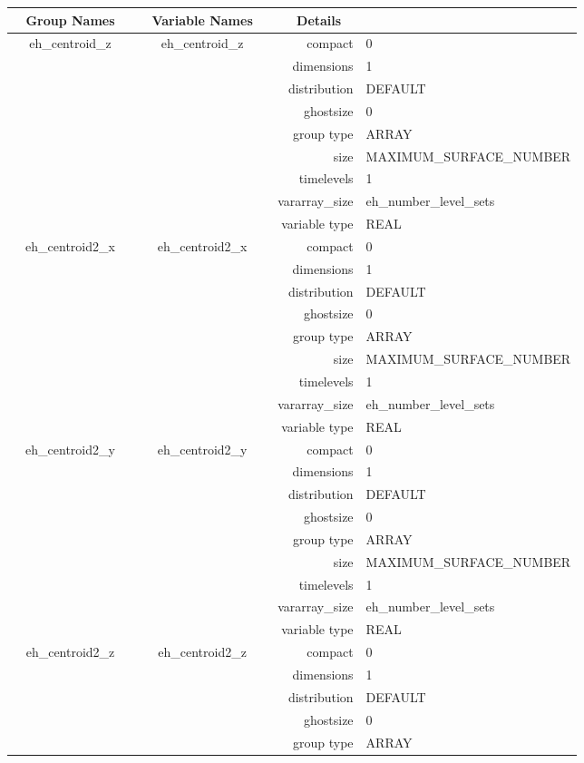 \begin{tabular*}{150mm}{|c|c@{\extracolsep{\fill}}|rl|} \hline 
~ {\bf Group Names} ~ & ~ {\bf Variable Names} ~  &{\bf Details} ~ & ~ \\ 
\hline 
eh\_centroid\_z & eh\_centroid\_z & compact & 0 \\ 
 &  & dimensions & 1 \\ 
 &  & distribution & DEFAULT \\ 
 &  & ghostsize & 0 \\ 
 &  & group type & ARRAY \\ 
 &  & size & MAXIMUM\_SURFACE\_NUMBER \\ 
 &  & timelevels & 1 \\ 
 &  & vararray\_size & eh\_number\_level\_sets \\ 
 &  & variable type & REAL \\ 
\hline 
eh\_centroid2\_x & eh\_centroid2\_x & compact & 0 \\ 
 &  & dimensions & 1 \\ 
 &  & distribution & DEFAULT \\ 
 &  & ghostsize & 0 \\ 
 &  & group type & ARRAY \\ 
 &  & size & MAXIMUM\_SURFACE\_NUMBER \\ 
 &  & timelevels & 1 \\ 
 &  & vararray\_size & eh\_number\_level\_sets \\ 
 &  & variable type & REAL \\ 
\hline 
eh\_centroid2\_y & eh\_centroid2\_y & compact & 0 \\ 
 &  & dimensions & 1 \\ 
 &  & distribution & DEFAULT \\ 
 &  & ghostsize & 0 \\ 
 &  & group type & ARRAY \\ 
 &  & size & MAXIMUM\_SURFACE\_NUMBER \\ 
 &  & timelevels & 1 \\ 
 &  & vararray\_size & eh\_number\_level\_sets \\ 
 &  & variable type & REAL \\ 
\hline 
eh\_centroid2\_z & eh\_centroid2\_z & compact & 0 \\ 
 &  & dimensions & 1 \\ 
 &  & distribution & DEFAULT \\ 
 &  & ghostsize & 0 \\ 
 &  & group type & ARRAY \\ 

\end{tabular*}
